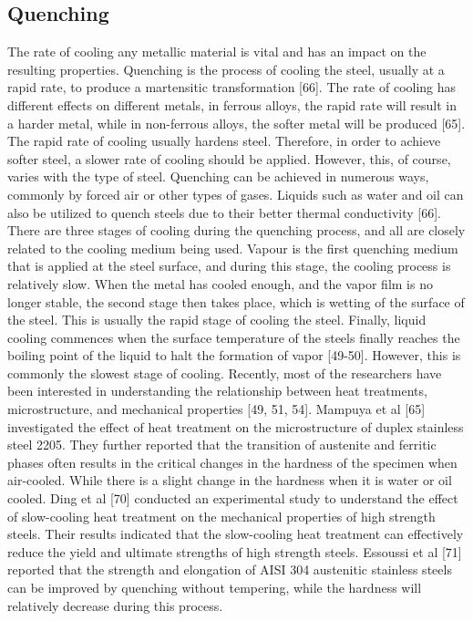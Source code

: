 \documentclass[12pt]{report}
\begin{document}
\subsection{Quenching}  
The rate of cooling any metallic material is vital and has an impact on the resulting properties. Quenching is the process of cooling the steel, usually at a rapid rate, to produce a martensitic transformation [66]. The rate of cooling has different effects on different metals, in ferrous alloys, the rapid rate will result in a harder metal, while in non-ferrous alloys, the softer metal will be produced [65]. The rapid rate of cooling usually hardens steel. Therefore, in order to achieve softer steel, a slower rate of cooling should be applied. However, this, of course, varies with the type of steel. 
Quenching can be achieved in numerous ways, commonly by forced air or other types of gases. Liquids such as water and oil can also be utilized to quench steels due to their better thermal conductivity [66]. There are three stages of cooling during the quenching process, and all are closely related to the cooling medium being used. Vapour is the first quenching medium that is applied at the steel surface, and during this stage, the cooling process is relatively slow. When the metal has cooled enough, and the vapor film is no longer stable, the second stage then takes place, which is wetting of the surface of the steel. This is usually the rapid stage of cooling the steel. Finally, liquid cooling commences when the surface temperature of the steels finally reaches the boiling point of the liquid to halt the formation of vapor [49-50]. However, this is commonly the slowest stage of cooling.
Recently, most of the researchers have been interested in understanding the relationship between heat treatments, microstructure, and mechanical properties [49, 51, 54]. Mampuya et al [65] investigated the effect of heat treatment on the microstructure of duplex stainless steel 2205. They further reported that the transition of austenite and ferritic phases often results in the critical changes in the hardness of the specimen when air-cooled. While there is a slight change in the hardness when it is water or oil cooled. Ding et al [70] conducted an experimental study to understand the effect of slow-cooling heat treatment on the mechanical properties of high strength steels. Their results indicated that the slow-cooling heat treatment can effectively reduce the yield and ultimate strengths of high strength steels. Essoussi et al [71] reported that the strength and elongation of AISI 304 austenitic stainless steels can be improved by quenching without tempering, while the hardness will relatively decrease during this process.
\end{document}
